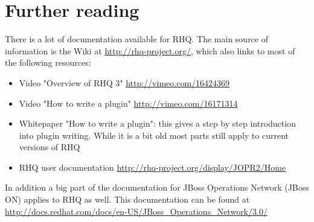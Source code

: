 \documentclass[twocolumn,10pt,a4paper]{article}
\begin{document}
\section{Further reading}

There is a lot of documentation available for RHQ. The main source of information is the Wiki at \url{http://rhq-project.org/}, which also links to most of the following resources:

\begin{itemize}
\item Video "Overview of RHQ 3" \url{http://vimeo.com/16424369}
\item Video "How to write a plugin" \url{http://vimeo.com/16171314}
\item Whitepaper "How to write a plugin": this gives a step by step introduction into plugin writing. While it is a bit old most parts still apply to current versions of RHQ
\item RHQ user documentation \url{http://rhq-project.org/display/JOPR2/Home}
\end{itemize}

In addition a big part of the documentation for JBoss Operations Network (JBoss ON) applies to RHQ as well. This documentation can be found at \url{http://docs.redhat.com/docs/en-US/JBoss_Operations_Network/3.0/}
\end{document}
